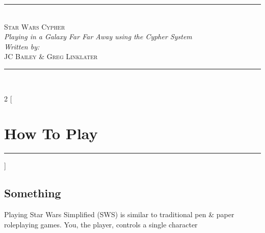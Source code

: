 \documentclass[a4paper,12pt,final]{book}
\newcommand{\HRule}{\rule{\linewidth}{0.5mm}} %
\newcommand{\newSection}[1]{\section*{#1} \HRule}
\begin{document}
\begin{titlepage}

\center
\vspace*{\fill}
\HRule \\[4mm]
{ \huge \textsc{Star Wars Cypher} }\\ %
{ \small \textit{Playing in a Galaxy Far Far Away using the Cypher System} }\\[3mm]
\emph{Written by:}\\ 
{\small \textsc{JC Bailey \& Greg Linklater}} \\%
\HRule \\[3mm]
\vspace*{\fill}
\end{titlepage} 

\begin{multicols*}{2}
[\newSection{How To Play}]
\subsection*{Something}
Playing Star Wars Simplified (SWS) is similar to traditional pen \& paper roleplaying games. You, the player, controls a single character
\end{multicols*}

\end{document}
